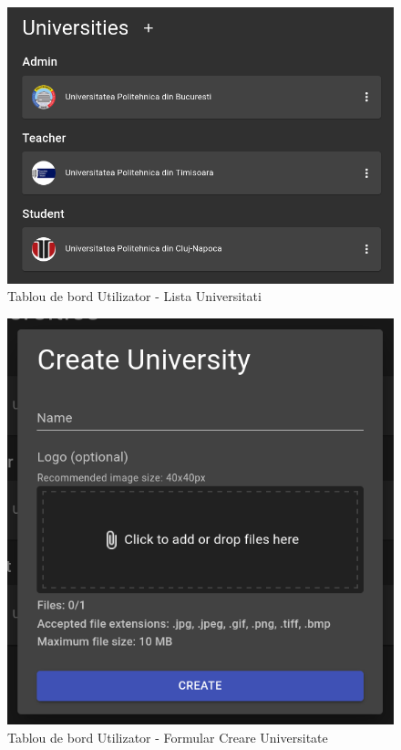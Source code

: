 \documentclass[12pt, a4paper, oneside, romanian]{teza-upb}
\begin{document}
\begin{figure}[H]
\centering
\includegraphics*[width=\columnwidth]{tablou-de-bord-utilizator-lista-universitati}
\caption{Tablou de bord Utilizator - Lista Universitati}
\label{tablou-de-bord-utilizator-lista-universitati}
\end{figure}

\begin{figure}[H]
\centering
\includegraphics*[width=0.6\columnwidth]{tablou-de-bord-utilizator-formular-creare-universitate}
\caption{Tablou de bord Utilizator - Formular Creare Universitate}
\label{tablou-de-bord-utilizator-formular-creare-universitate}
\end{figure}
\end{document}

